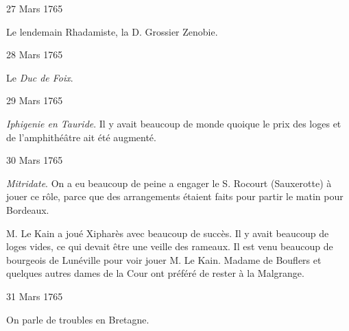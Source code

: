                      \begin{diary}{27 Mars 1765}{}

                         Le lendemain Rhadamiste, la D. Grossier Zenobie. \bigskip


                     \end{diary}

                     \begin{diary}{28 Mars 1765}{}

                         Le \emph{Duc de
                              Foix}. \bigskip


                     \end{diary}

                     \begin{diary}{29 Mars 1765}{}


                           \emph{Iphigenie en Tauride}. Il y avait beaucoup
                           de monde quoique le prix des loges et de
                           l'amphithéâtre ait été augmenté. \bigskip


                     \end{diary}

                     \begin{diary}{30 Mars 1765}{}


                           \emph{Mitridate}. On a eu beaucoup de peine a
                           engager le S. Rocourt
                           (Sauxerotte) à jouer ce
                           rôle, parce que des arrangements étaient faits
                           pour partir le matin pour Bordeaux. \bigskip



                           M. Le Kain a joué Xipharès avec
                           beaucoup
                           de succès. Il y avait beaucoup de loges vides,
                           ce qui devait être une veille des rameaux.
                           Il est venu beaucoup de bourgeois de Lunéville
                           pour voir jouer M. Le Kain.
                              Madame de
                              Bouflers et quelques autres dames de la
                           Cour ont préféré de rester à la
                              Malgrange. \bigskip


                     \end{diary}

                     \begin{diary}{31 Mars 1765}{}

                         On parle de troubles en Bretagne. \bigskip


                     \end{diary}

